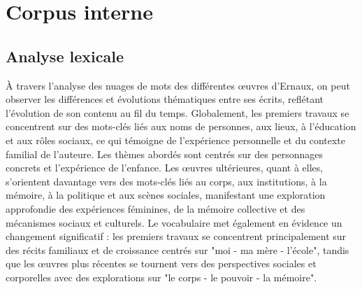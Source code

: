 \section{Corpus interne}

\subsection{Analyse lexicale}
À travers l’analyse des nuages de mots des différentes œuvres d'Ernaux, on peut observer les différences et évolutions thématiques entre ses écrits, reflétant l’évolution de son contenu au fil du temps. Globalement, les premiers travaux se concentrent sur des mots-clés liés aux noms de personnes, aux lieux, à l’éducation et aux rôles sociaux, ce qui témoigne de l'expérience personnelle et du contexte familial de l’auteure. Les thèmes abordés sont centrés sur des personnages concrets et l’expérience de l’enfance. Les œuvres ultérieures, quant à elles, s'orientent davantage vers des mots-clés liés au corps, aux institutions, à la mémoire, à la politique et aux scènes sociales, manifestant une exploration approfondie des expériences féminines, de la mémoire collective et des mécanismes sociaux et culturels. Le vocabulaire met également en évidence un changement significatif : les premiers travaux se concentrent principalement sur des récits familiaux et de croissance centrés sur "moi - ma mère - l’école", tandis que les œuvres plus récentes se tournent vers des perspectives sociales et corporelles avec des explorations sur "le corps - le pouvoir - la mémoire".\\

